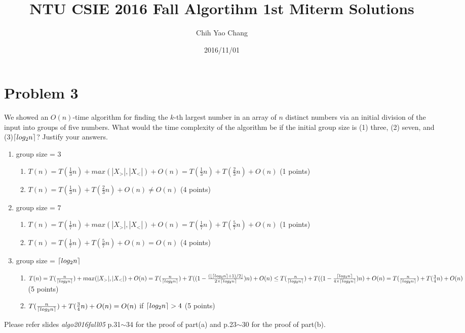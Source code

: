 \documentclass[a4paper]{article}
\title{NTU CSIE 2016 Fall Algortihm 1st Miterm Solutions}
\author{Chih Yao Chang}
\date{2016/11/01}
\DeclarePairedDelimiter{\ceil}{\lceil}{\rceil}
\DeclarePairedDelimiter{\floor}{\lfloor}{\rfloor}
\begin{document}
\maketitle

\section{Problem 3}

We showed an $O(n)$-time algorithm for finding the $k$-th largest number in an array of $n$ distinct numbers via an initial division of the input into groups of five numbers. What would the time complexity of the algorithm be if the initial group size is (1) three, (2) seven, and (3)$\ceil*{log_2 n}$? Justify your answers.

\begin{enumerate}
\item group size = $3$
\begin{enumerate}
\item $T(n) = T(\frac{1}{3}n) + max(|X_>|, |X_<|) + O(n) = T(\frac{1}{3}n) + T(\frac{2}{3}n) + O(n)$ (1 points)
\item $T(n) = T(\frac{1}{3}n) + T(\frac{2}{3}n) + O(n) \neq O(n)$ (4 points)
\end{enumerate}
\item group size = $7$
\begin{enumerate}
\item $T(n) = T(\frac{1}{7}n) + max(|X_>|, |X_<|) + O(n) = T(\frac{1}{7}n) + T(\frac{5}{7}n) + O(n)$ (1 points)
\item $T(n) = T(\frac{1}{7}n) + T(\frac{5}{7}n) + O(n) = O(n)$ (4 points)
\end{enumerate}
\item group size = $\ceil*{log_2 n}$
\begin{enumerate}
\item $T(n) = T(\frac{n}{\ceil*{log_2 n}}) + max(|X_>|, |X_<|) + O(n) = T(\frac{n}{\ceil*{log_2 n}}) + T((1-\frac{(\floor{\ceil*{log_2 n}+1)/2}}{2 \times\ceil*{log_2 n}})n) + O(n) \leq T(\frac{n}{\ceil*{log_2 n}}) + T((1-\frac{\ceil*{log_2 n}}{4 \times\ceil*{log_2 n}})n) + O(n) = T(\frac{n}{\ceil*{log_2 n}}) + T(\frac{3}{4}n) + O(n)$ (5 points)
\item $T(\frac{n}{\ceil*{log_2 n}}) + T(\frac{3}{4}n) + O(n) = O(n)$ if $\ceil*{log_2 n} > 4$ (5 points)
\end{enumerate}
\end{enumerate}
Please refer slides {\em algo2016fall05} p.31$\sim$34 for the proof of part(a) and p.23$\sim$30 for the proof of part(b).
\end{document}
